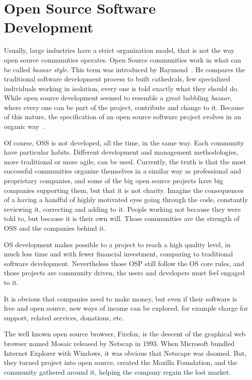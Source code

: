 \section{Open Source Software Development}
Usually, large industries have a strict organization model, that is not the way open source communities operates.
Open Source communities work in what can be called \textit{bazaar style}.
This term was introduced by Raymond~\cite{raymondcathedral}. 
He compares the traditional software development process to built cathedrals,
few specialized individuals working in isolation, every one is told exactly what they should do.
While open source development seemed to resemble a great babbling \textit{bazaar}, 
where every one can be part of the project, contribute and change to it. 
Because of this nature, the specification of an open source software project 
evolves in an organic way~\cite{capiluppicathedral}.

Of course, OSS is not developed, all the time, in the same way. 
Each community have particular habits. 
Different development and management methodologies, more traditional or more agile, can be used.
Currently, the truth is that the most successful communities organize themselves 
in a similar way as professional and proprietary companies, 
and some of the big open source projects have big companies supporting them, 
but that it is not charity.
Imagine the consequences of a having a handful of highly motivated eyes going through the code, 
constantly reviewing it, correcting and adding to it.
People working not because they were told to, but because it is their own will.
Those communities are the strength of OSS and the companies behind it.

OS development makes possible to a project to reach a high quality level,
in much less time and with fewer financial investment, comparing to traditional software development.
Nevertheless those OSP still follow the OS core rules, 
and those projects are community driven, the users and developers must feel engaged to it.

It is obvious that companies need to make money, 
but even if their software is free and open source, new ways of income can be explored, 
for example charge for support, related services, donations, etc. 

 The well known open source browser, Firefox, 
is the descent of the graphical web browser named Mosaic released by Netscap in 1993.
When Microsoft bundled Internet Explorer with Windows, it was obvious that Netscape was doomed.
But, they turned project into open source, created the Mozilla Foundation, 
and the community gathered around it, helping the company regain the lost market. 


